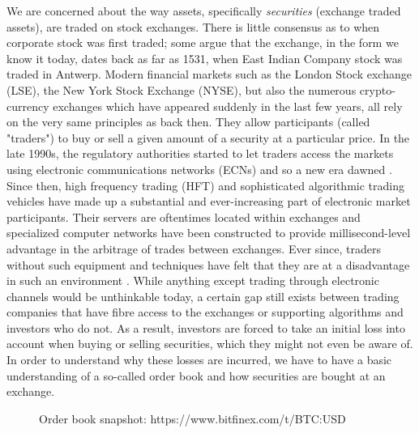 We are concerned about the way assets, specifically \textit{securities} (exchange traded assets), are traded on stock exchanges.
There is little consensus as to when corporate stock was first traded; some argue that the exchange, in the form we know it today, dates back as far as 1531, when East Indian Company stock was traded in Antwerp\cite{stock-exchange}.
Modern financial markets such as the London Stock exchange (LSE), the New York Stock Exchange (NYSE), but also the numerous crypto-currency exchanges which have appeared suddenly in the last few years, all rely on the very same principles as back then.
They allow participants (called "traders") to buy or sell a given amount of a security at a particular price.
In the late 1990s, the regulatory authorities started to let traders access the markets using electronic communications networks (ECNs) and so a new era dawned \cite{patterson2012dark}.
Since then, high frequency trading (HFT) and sophisticated algorithmic trading vehicles have made up a substantial and ever-increasing part of electronic market participants.
Their servers are oftentimes located within exchanges and specialized computer networks have been constructed to provide millisecond-level advantage in the arbitrage of trades between exchanges.
Ever since, traders without such equipment and techniques have felt that they are at a disadvantage in such an environment \cite{patterson2012dark}.
While anything except trading through electronic channels would be unthinkable today, a certain gap still exists between trading companies that have fibre access to the exchanges or supporting algorithms and investors who do not.
As a result, investors are forced to take an initial loss into account when buying or selling securities, which they might not even be aware of.
In order to understand why these losses are incurred, we have to have a basic understanding of a so-called order book and how securities are bought at an exchange.

\begin{figure}[H]
    \centering
    \caption{Order book snapshot: https://www.bitfinex.com/t/BTC:USD}
    \label{fig:intro-orderbook}
\end{figure}

